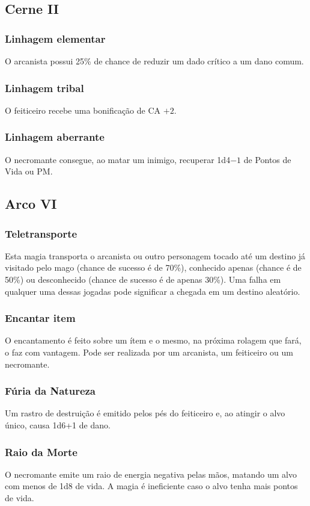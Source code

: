 \documentclass[10pt,twoside,twocolumn]{book}
\begin{document}
\subsection*{Cerne II}
\subsubsection*{Linhagem elementar}
O arcanista possui 25\% de chance de reduzir um dado crítico a um dano comum.
\subsubsection*{Linhagem tribal}
O feiticeiro recebe uma bonificação de CA $+2$.
\subsubsection*{Linhagem aberrante}
O necromante consegue, ao matar um inimigo, recuperar 1d4$-1$ de Pontos de Vida ou PM.

\subsection*{Arco VI}
\subsubsection*{Teletransporte}
Esta magia transporta o arcanista ou outro personagem tocado até um destino já visitado pelo mago (chance de sucesso é de 70\%), conhecido apenas (chance é de 50\%) ou desconhecido (chance de sucesso é de apenas 30\%). Uma falha em qualquer uma dessas jogadas pode significar a chegada em um destino aleatório.
\subsubsection*{Encantar item}
O encantamento é feito sobre um ítem e o mesmo, na próxima rolagem que fará, o faz com vantagem. Pode ser realizada por um arcanista, um feiticeiro ou um necromante. 
\subsubsection*{Fúria da Natureza}
Um rastro de destruição é emitido pelos pés do feiticeiro e, ao atingir o alvo único, causa 1d6+1 de dano.
\subsubsection*{Raio da Morte}
O necromante emite um raio de energia negativa pelas mãos, matando um alvo com menos de 1d8 de vida. A magia é ineficiente caso o alvo tenha mais pontos de vida.
\end{document}
